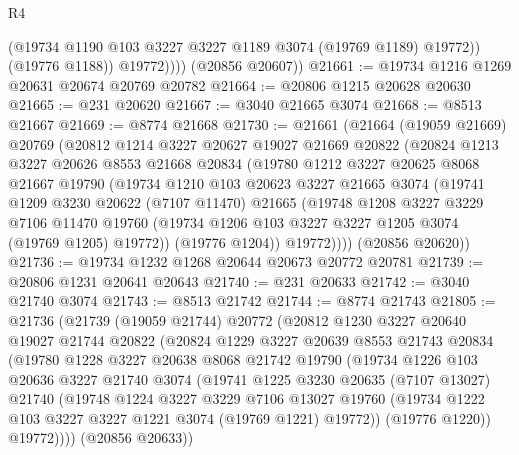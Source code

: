 \begin{lexlean}{R4}
\begin{coremodule}
                  (@19734 @1190 @103 @3227 @3227 @1189 @3074 (@19769 @1189) @19772))
                (@19776 @1188))
              @19772))))
      (@20856 @20607))
@21661 := @19734 @1216 @1269 @20631 @20674 @20769 @20782
@21664 := @20806 @1215 @20628 @20630
@21665 := @231 @20620
@21667 := @3040 @21665 @3074
@21668 := @8513 @21667
@21669 := @8774 @21668
@21730 := @21661
    (@21664
      (@19059 @21669)
      @20769
      (@20812
        @1214
        @3227
        @20627
        @19027
        @21669
        @20822
        (@20824
          @1213
          @3227
          @20626
          @8553
          @21668
          @20834
          (@19780
            @1212
            @3227
            @20625
            @8068
            @21667
            @19790
            (@19734
              @1210
              @103
              @20623
              @3227
              @21665
              @3074
              (@19741
                @1209
                @3230
                @20622
                (@7107 @11470)
                @21665
                (@19748
                  @1208
                  @3227
                  @3229
                  @7106
                  @11470
                  @19760
                  (@19734 @1206 @103 @3227 @3227 @1205 @3074 (@19769 @1205) @19772))
                (@19776 @1204))
              @19772))))
      (@20856 @20620))
@21736 := @19734 @1232 @1268 @20644 @20673 @20772 @20781
@21739 := @20806 @1231 @20641 @20643
@21740 := @231 @20633
@21742 := @3040 @21740 @3074
@21743 := @8513 @21742
@21744 := @8774 @21743
@21805 := @21736
    (@21739
      (@19059 @21744)
      @20772
      (@20812
        @1230
        @3227
        @20640
        @19027
        @21744
        @20822
        (@20824
          @1229
          @3227
          @20639
          @8553
          @21743
          @20834
          (@19780
            @1228
            @3227
            @20638
            @8068
            @21742
            @19790
            (@19734
              @1226
              @103
              @20636
              @3227
              @21740
              @3074
              (@19741
                @1225
                @3230
                @20635
                (@7107 @13027)
                @21740
                (@19748
                  @1224
                  @3227
                  @3229
                  @7106
                  @13027
                  @19760
                  (@19734 @1222 @103 @3227 @3227 @1221 @3074 (@19769 @1221) @19772))
                (@19776 @1220))
              @19772))))
      (@20856 @20633))

\end{coremodule}
\end{lexlean}
